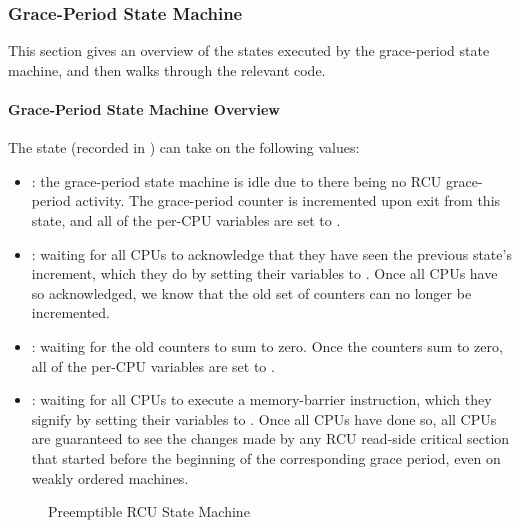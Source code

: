 \subsubsection{Grace-Period State Machine}
\label{app:rcuimpl:Grace-Period State Machine}

This section gives an overview of the states executed by the grace-period
state machine, and then walks through the relevant code.

\paragraph{Grace-Period State Machine Overview}
\label{app:rcuimpl:Grace-Period State Machine Overview}

The state (recorded in )
can take on the following values:

\begin{itemize}
\item	{}:  the grace-period state
	machine is idle due to there being no RCU grace-period activity.
	The  grace-period counter
	is incremented upon exit from this state, and all of the
	per-CPU  variables are set
	to .
\item	{}:
	waiting for all CPUs to acknowledge that they have seen the
	previous state's increment, which they do by setting their
	 variables to .
	Once all CPUs have so acknowledged, we know that the old
	set of counters can no longer be incremented.
\item	{}:
	waiting for the old counters to sum to zero.
	Once the counters sum to zero, all of the per-CPU
	 variables are set to
	.
\item	{}:
	waiting for all CPUs to execute a memory-barrier instruction,
	which they signify by setting their 
	variables to .
	Once all CPUs have done so, all CPUs are guaranteed to see
	the changes made by any RCU read-side critical section that
	started before the beginning of the corresponding grace period,
	even on weakly ordered machines.
\end{itemize}

\begin{figure}[htb]
\centering
{}
\caption{Preemptible RCU State Machine}
\label{app:rcuimpl:Preemptible RCU State Machine}
\end{figure}

